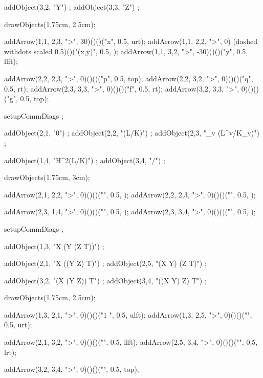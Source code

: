   addObject(3,2, "Y") ;
  addObject(3,3, "Z") ;
    
  drawObjects(1.75cm, 2.5cm);
  
  addArrow(1,1, 2,3, ">", 30)()()("x", 0.5, urt);
  addArrow(1,1, 2,2, ">", 0)
    (dashed withdots scaled 0.5)()("(x,y)", 0.5, );
  addArrow(1,1, 3,2, ">", -30)()()("y", 0.5, llft);

  addArrow(2,2, 2,3, ">", 0)()()("p", 0.5, top);
  addArrow(2,2, 3,2, ">", 0)()()("q", 0.5, rt);
  addArrow(2,3, 3,3, ">", 0)()()("f", 0.5, rt);
  addArrow(3,2, 3,3, ">", 0)()()("g", 0.5, top);
\stopMPcode\stopformula
\stopbuffer

\processTEXbuffer

\typebuffer

\startbuffer
\startformula{}
  setupCommDiags ;
  
  addObject(2,1, "0") ;
  addObject(2,2, "(L/K)") ;
  addObject(2,3, "\bigoplus_v (L^v/K_v)") ;
  
  addObject(1,4, "H^2(L/K)") ;
  addObject(3,4, "/") ;
    
  drawObjects(1.75cm, 3cm);
  
  addArrow(2,1, 2,2, ">", 0)()()("", 0.5, );
  addArrow(2,2, 2,3, ">", 0)()()("", 0.5, );
  
  addArrow(2,3, 1,4, ">", 0)()()("", 0.5, );
  addArrow(2,3, 3,4, ">", 0)()()("", 0.5, );
\stopMPcode\stopformula
\stopbuffer

\processTEXbuffer

\typebuffer

\startbuffer
\startformula{}
  setupCommDiags ;
  
  addObject(1,3, "X \otimes (Y \otimes (Z \otimes T))") ;
  
  addObject(2,1, "X \otimes ((Y \otimes Z) \otimes T)") ;
  addObject(2,5, "(X \otimes Y) \otimes (Z \otimes T)") ;
  
  addObject(3,2, "(X \otimes (Y \otimes Z)) \otimes T") ;
  addObject(3,4, "((X \otimes Y) \otimes Z) \otimes T") ;
    
  drawObjects(1.75cm, 2.5cm);
  
  addArrow(1,3, 2,1, ">", 0)()()("1 \otimes \phi", 0.5, ulft);
  addArrow(1,3, 2,5, ">", 0)()()("\phi", 0.5, urt);
  
  addArrow(2,1, 3,2, ">", 0)()()("\phi", 0.5, llft);
  addArrow(2,5, 3,4, ">", 0)()()("\phi", 0.5, lrt);
  
  addArrow(3,2, 3,4, ">", 0)()()("\phi {}", 0.5, top);
\stopMPcode\stopformula
\stopbuffer

